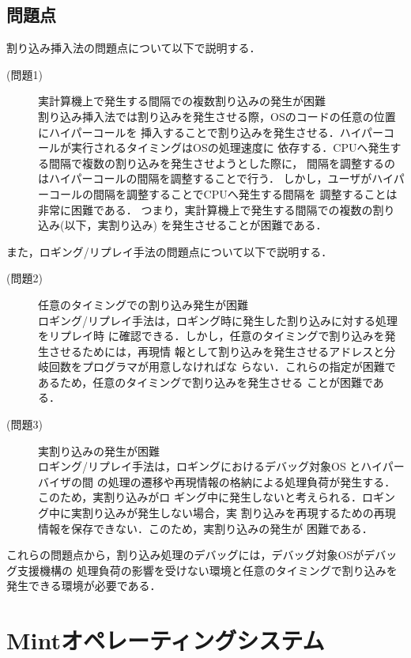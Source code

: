 \documentclass[tanilab-enum]{graduate}
\begin{document}
\section{問題点}\label{mondai}
割り込み挿入法の問題点について以下で説明する．
\begin{description}
    \item[(問題1)]実計算機上で発生する間隔での複数割り込みの発生が困難\\
        割り込み挿入法では割り込みを発生させる際，OSのコードの任意の位置にハイパーコールを
        挿入することで割り込みを発生させる．ハイパーコールが実行されるタイミングはOSの処理速度に
        依存する．CPUへ発生する間隔で複数の割り込みを発生させようとした際に，
        間隔を調整するのはハイパーコールの間隔を調整することで行う．
        しかし，ユーザがハイパーコールの間隔を調整することでCPUへ発生する間隔を
        調整することは非常に困難である．
        つまり，実計算機上で発生する間隔での複数の割り込み(以下，実割り込み)
        を発生させることが困難である．
\end{description}
また，ロギング/リプレイ手法の問題点について以下で説明する．
\begin{description}
    \item[(問題2)]任意のタイミングでの割り込み発生が困難\\
        ロギング/リプレイ手法は，ロギング時に発生した割り込みに対する処理をリプレイ時
        に確認できる．しかし，任意のタイミングで割り込みを発生させるためには，再現情
        報として割り込みを発生させるアドレスと分岐回数をプログラマが用意しなければな
        らない．これらの指定が困難であるため，任意のタイミングで割り込みを発生させる
        ことが困難である．
    \item[(問題3)]実割り込みの発生が困難\\
        ロギング/リプレイ手法は，ロギングにおけるデバッグ対象OS とハイパーバイザの間
        の処理の遷移や再現情報の格納による処理負荷が発生する．このため，実割り込みがロ
        ギング中に発生しないと考えられる．ロギング中に実割り込みが発生しない場合，実
        割り込みを再現するための再現情報を保存できない．このため，実割り込みの発生が
        困難である．
\end{description}
これらの問題点から，割り込み処理のデバッグには，デバッグ対象OSがデバッグ支援機構の
処理負荷の影響を受けない環境と任意のタイミングで割り込みを発生できる環境が必要である．
\chapter{Mintオペレーティングシステム}\label{chap:Mint}
\end{document}
